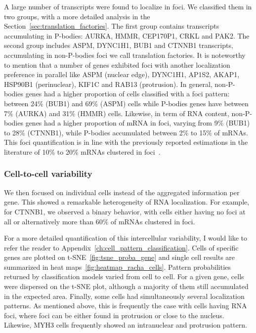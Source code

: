 A large number of transcripts were found to localize in foci.
We classified them in two groups, with a more detailed analysis in the Section~\ref{sec:translation_factories}.
The first group contains transcripts accumulating in \ac{P-bodies}: AURKA, HMMR, CEP170P1, CRKL and PAK2.
The second group includes ASPM, DYNC1H1, BUB1 and CTNNB1 transcripts, accumulating in non-\ac{P-bodies} foci we call translation factories.
It is noteworthy to mention that a number of genes exhibited foci with another localization preference in parallel like ASPM (nuclear edge), DYNC1H1, AP1S2, AKAP1, HSP90B1 (perinuclear), KIF1C and RAB13 (protrusion).
In general, non-\ac{P-bodies} genes had a higher proportion of cells classified with a foci pattern: between 24\% (BUB1) and 69\% (ASPM) cells while \ac{P-bodies} genes have between 7\% (AURKA) and 31\% (HMMR) cells.
Likewise, in term of RNA content, non-\ac{P-bodies} genes had a higher proportion of \ac{mRNA} in foci, varying from 9\% (BUB1) to 28\% (CTNNB1), while \ac{P-bodies} accumulated between 2\% to 15\% of \ac{mRNA}s.
This foci quantification is in line with the previously reported estimations in the literature of 10\% to 20\% \ac{mRNA}s clustered in foci~\cite{Pillai_2005, Hubstenberger_2017}.

\subsubsection{Cell-to-cell variability}

We then focused on individual cells instead of the aggregated information per gene.
This showed a remarkable heterogeneity of \ac{RNA} localization.
For example, for CTNNB1, we observed a binary behavior, with cells either having no foci at all or alternatively more than 60\% of \ac{mRNA}s clustered in foci.

For a more detailed quantification of this intercellular variability, I would like to refer the reader to Appendix~\ref{ch:cell_pattern_classification}.
Cells of specific genes are plotted on \ac{t-SNE}~\ref{fig:tsne_proba_gene} and single cell results are summarized in heat maps~\ref{fig:heatmap_racha_cells}.
Pattern probabilities returned by classification models varied from cell to cell.
For a given gene, cells were dispersed on the \ac{t-SNE} plot, although a majority of them still accumulated in the expected area.
Finally, some cells had simultaneously several localization patterns.
As mentioned above, this is frequently the case with cells having \ac{RNA} foci, where foci can be either found in protrusion or close to the nucleus.
Likewise, MYH3 cells frequently showed an intranuclear and protrusion pattern.

